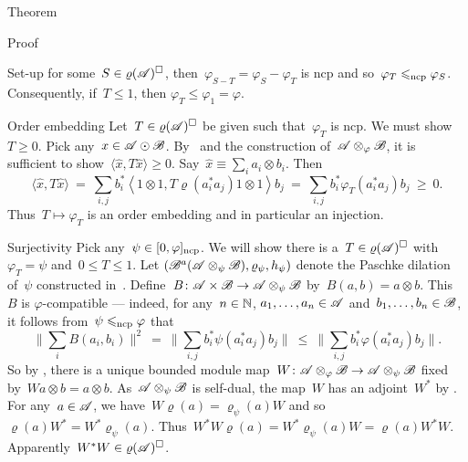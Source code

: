 \begin{parsec}
\begin{point}{Theorem}
\begin{point}{Proof}
\begin{point}{Set-up}
    for some~$S \in \varrho(\mathscr{A})^\square$,
    then~$\varphi_{S-T} = \varphi_S - \varphi_T$ is ncp
    and so~$\varphi_T \mathrel{\leqslant_{\mathrm{ncp}}} \varphi_S$.
Consequently, if~$T\leq 1$, then $\varphi_T \leq \varphi_1 = \varphi$.
\end{point}
\begin{point}{Order embedding}%
Let~$T \in \varrho(\mathscr{A})^\square$
    be given such that~$\varphi_T$ is ncp.
We must show~$T \geq 0$.
Pick any~$x \in \mathscr{A} \odot \mathscr{B}$.
By~ and
    the construction of~$\mathscr{A} \otimes_\varphi \mathscr{B}$,
    it is sufficient to show~$\langle \hat{x}, T \hat{x}\rangle \geq 0$.
Say~$\hat{x} \equiv \sum_i a_i \otimes b_i$.
Then
\begin{equation*}
    \langle\hat{x}, T \hat{x} \rangle
    \ =\  \sum_{i,j} b_i^* \left< 1\otimes 1, T \varrho(a_i^*a_j) 1 \otimes 1\right> b_j
    \ = \ \sum_{i,j} b_i^* \varphi_T (a_i^*a_j) b_j \ \geq\  0.
\end{equation*}
Thus~$T \mapsto \varphi_T$ is an order embedding
    and in particular an injection.
\end{point}
\begin{point}{Surjectivity}%
Pick any~$\psi \in [0,\varphi]_{\mathrm{ncp}}$.
We will show there is a~$T \in \varrho(\mathscr{A})^\square$
    with~$\varphi_T = \psi$ and~$0 \leq T \leq 1$.
Let $(\mathscr{B}^a(\mathscr{A} \otimes_\psi \mathscr{B}),
    \varrho_\psi, h_\psi)$ denote the Paschke dilation of~$\psi$
    constructed in~.
Define~$B\colon \mathscr{A} \times \mathscr{B} \to \mathscr{A} \otimes_\psi \mathscr{B}$
    by~$B(a,b) = a \otimes b$.
This~$B$ is $\varphi$-compatible
--- indeed, for any~$n \in \mathbb{N}$, $a_1, \ldots, a_n \in \mathscr{A}$
    and~$b_1, \ldots, b_n \in \mathscr{B}$,
    it follows from~$\psi \mathrel{\leqslant_{\mathrm{ncp}}} \varphi$ that
\begin{equation*}
    \bigl\| \sum_i B(a_i, b_i) \bigr\|^2
     \ = \  \bigl\| \sum_{i,j}
                b_i^* \psi(a_i^*a_j) b_j \bigr\|
     \ \leq \  \bigl\| \sum_{i,j}
                b_i^* \varphi(a_i^*a_j) b_j \bigr\|.
\end{equation*}
So by ,
    there is a unique bounded module
    map~$W \colon \mathscr{A} \otimes_\varphi \mathscr{B} \to \mathscr{A} \otimes_\psi \mathscr{B}$
    fixed by~$W a \otimes b = a \otimes b$.
As~$\mathscr{A} \otimes_\psi \mathscr{B}$ is self-dual,
    the map~$W$ has an adjoint~$W^*$ by .
For any~$a\in\mathscr{A}$, we have~$W \varrho(a) = \varrho_\psi(a) W$
and so~$\varrho(a) W^* = W^* \varrho_\psi(a)$.
Thus~$W^*W \varrho(a) = W^* \varrho_\psi(a) W = \varrho(a) W^*W$.
Apparently~$W^*W \in \varrho(\mathscr{A})^\square$.

\end{point}
\end{point}
\end{point}
\end{parsec}
